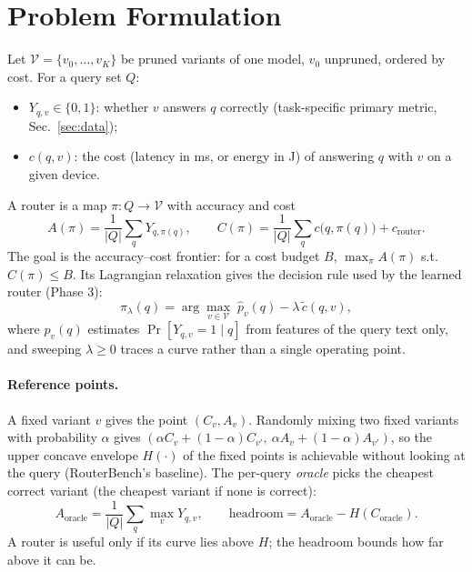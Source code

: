 \documentclass[11pt,a4paper]{article}
\begin{document}
\section{Problem Formulation}
\label{sec:problem}
Let $\mathcal{V}=\{v_0,\dots,v_K\}$ be pruned variants of one model, $v_0$ unpruned, ordered by cost.
For a query set $Q$:
\begin{itemize}
  \item $Y_{q,v}\in\{0,1\}$: whether $v$ answers $q$ correctly (task-specific primary metric, Sec.~\ref{sec:data});
  \item $c(q,v)$: the cost (latency in ms, or energy in J) of answering $q$ with $v$ on a given device.
\end{itemize}
A router is a map $\pi:Q\to\mathcal{V}$ with accuracy and cost
\begin{equation}
  A(\pi)=\frac1{|Q|}\sum_{q}Y_{q,\pi(q)},\qquad C(\pi)=\frac1{|Q|}\sum_q c\big(q,\pi(q)\big)+c_{\text{router}} .
\end{equation}
The goal is the accuracy--cost frontier: for a cost budget $B$, $\max_\pi A(\pi)$ s.t.\ $C(\pi)\le B$.
Its Lagrangian relaxation gives the decision rule used by the learned router (Phase 3):
\begin{equation}
  \pi_\lambda(q)=\arg\max_{v\in\mathcal V}\;\hat p_v(q)-\lambda\,\tilde c(q,v),
  \label{eq:router}
\end{equation}
where $\hat p_v(q)$ estimates $\Pr[Y_{q,v}=1\mid q]$ from features of the query text only, and sweeping
$\lambda\ge0$ traces a curve rather than a single operating point.

\paragraph{Reference points.} A fixed variant $v$ gives the point $(C_v,A_v)$. Randomly mixing two fixed
variants with probability $\alpha$ gives $(\alpha C_v+(1-\alpha)C_{v'},\ \alpha A_v+(1-\alpha)A_{v'})$, so the
upper concave envelope $H(\cdot)$ of the fixed points is achievable without looking at the query
(RouterBench's baseline). The per-query \emph{oracle} picks the cheapest correct variant (the cheapest
variant if none is correct):
\begin{equation}
  A_{\text{oracle}}=\frac1{|Q|}\sum_q\max_vY_{q,v},\qquad
  \text{headroom}=A_{\text{oracle}}-H\!\left(C_{\text{oracle}}\right).
  \label{eq:headroom}
\end{equation}
A router is useful only if its curve lies above $H$; the headroom bounds how far above it can be.
\end{document}
